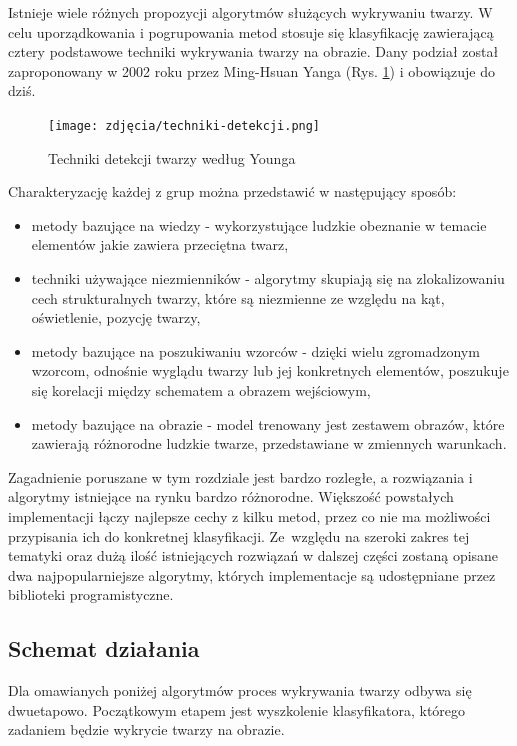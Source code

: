 Istnieje wiele różnych propozycji algorytmów służących wykrywaniu twarzy. W celu uporządkowania i pogrupowania metod stosuje się klasyfikację zawierającą cztery podstawowe techniki wykrywania twarzy na obrazie. Dany podział został zaproponowany w 2002 roku przez Ming-Hsuan Yanga (Rys. \ref{fig:detectionMethods}) i obowiązuje do dziś.

\begin{figure}[h]
	\centering
	\texttt{[image: zdjęcia/techniki-detekcji.png]}
	\caption{Techniki detekcji twarzy według Younga} 
	\label{fig:detectionMethods}
\end{figure}

Charakteryzację każdej z grup \cite{Yang} można przedstawić w następujący sposób:
\begin{itemize}
    \item metody bazujące na wiedzy - wykorzystujące ludzkie obeznanie w temacie elementów jakie zawiera przeciętna twarz,
    \item techniki używające niezmienników - algorytmy skupiają się na zlokalizowaniu cech strukturalnych twarzy, które są niezmienne ze względu na kąt, oświetlenie, pozycję twarzy,
    \item metody bazujące na poszukiwaniu wzorców - dzięki wielu zgromadzonym wzorcom, odnośnie wyglądu twarzy lub jej konkretnych elementów, poszukuje się korelacji między schematem a obrazem wejściowym,
    \item metody bazujące na obrazie - model trenowany jest zestawem obrazów, które zawierają różnorodne ludzkie twarze, przedstawiane w zmiennych warunkach.
\end{itemize}

Zagadnienie poruszane w tym rozdziale jest bardzo rozległe, a rozwiązania i algorytmy istniejące na rynku bardzo różnorodne. Większość powstałych implementacji łączy najlepsze cechy z kilku metod, przez co nie ma możliwości przypisania ich do konkretnej klasyfikacji. Ze~względu na szeroki zakres tej 
tematyki oraz dużą ilość istniejących rozwiązań w dalszej części zostaną opisane dwa najpopularniejsze algorytmy, których implementacje są udostępniane przez biblioteki programistyczne.


\subsection{Schemat działania}
Dla omawianych poniżej algorytmów proces wykrywania twarzy odbywa się dwuetapowo. Początkowym etapem jest wyszkolenie klasyfikatora, którego zadaniem będzie wykrycie twarzy na obrazie. 


